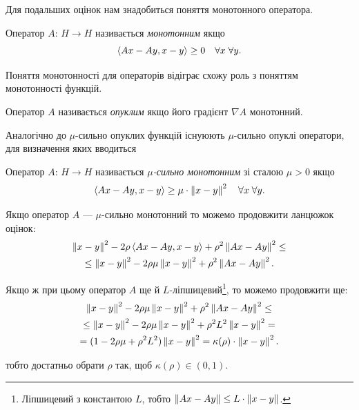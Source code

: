 Для подальших оцінок нам знадобиться поняття монотонного оператора.

\begin{definition}
    Оператор $A$: $H \to H$ називається \textit{монотонним} якщо
    \begin{equation}
        \sp{A x - A y, x - y} \ge 0 \quad \forall x \; \forall y.
    \end{equation}
\end{definition}

Поняття монотонності для операторів відіграє схожу роль з поняттям монотонності функцій.

\begin{example}
    Оператор $A$ називається \textit{опуклим} якщо його градієнт $\nabla A$ монотонний.
\end{example}

Аналогічно до $\mu$-сильно опуклих функцій існуюють $\mu$-сильно опуклі оператори, для визначення яких вводиться
\begin{definition}
    Оператор $A$: $H \to H$ називається \textit{$\mu$-сильно монотонним} зі сталою $\mu > 0$ якщо
    \begin{equation}
        \sp{A x - A y, x - y} \ge \mu \cdot \no{x - y}^2 \quad \forall x \; \forall y.
    \end{equation}
\end{definition}

Якщо оператор $A$ --- $\mu$-сильно монотонний то можемо продовжити ланцюжок оцінок:
\begin{multline}
    \no{x - y}^2 - 2 \rho \sp{A x - A y, x - y} + \rho^2 \no{A x - Ay}^2 \le \\
    \le \no{x - y}^2 - 2 \rho \mu \no{x - y}^2 + \rho^2 \no{A x - A y}^2.
\end{multline}

Якщо ж при цьому оператор $A$ ще й $L$-ліпшицевий\footnote{Ліпшицевий з константою $L$, тобто $\no{A x - A y} \le L \cdot \no{x - y}$.}, то можемо продовжити ще:
\begin{multline}
    \no{x - y}^2 - 2 \rho \mu \no{x - y}^2 + \rho^2 \no{A x - A y}^2 \le \\
    \le \no{x - y}^2 - 2 \rho \mu \no{x - y}^2 + \rho^2 L^2 \no{x - y}^2 = \\
    = (1 - 2 \rho \mu + \rho^2 L^2) \no{x - y}^2 = \kappa(\rho) \cdot \no{x - y}^2.
\end{multline}

тобто достатньо обрати $\rho$ так, щоб $\kappa(\rho) \in (0, 1)$. \medskip

